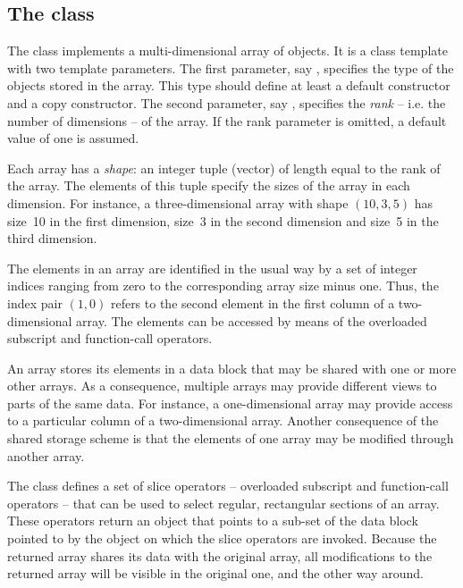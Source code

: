 \subsection*{The  class}

The  class implements a multi-dimensional array of objects.
It is a class template with two template parameters. The first parameter,
say , specifies the type of the objects stored in the array. This
type should define at least a default constructor and a copy
constructor. The second parameter, say , specifies the
\emph{rank} -- i.e. the number of dimensions -- of the array. If the rank
parameter is omitted, a default value of one is assumed.

Each array has a \emph{shape}: an integer tuple (vector) of length equal
to the rank of the array. The elements of this tuple specify the sizes of
the array in each dimension. For instance, a three-dimensional array with
shape $(10,3,5)$ has size~10 in the first dimension, size~3 in the second
dimension and size~5 in the third dimension.

The elements in an array are identified in the usual way by a set of
integer indices ranging from zero to the corresponding array size minus
one. Thus, the index pair $(1,0)$ refers to the second element in the
first column of a two-dimensional array. The elements can be accessed by
means of the overloaded subscript and function-call operators.

An array stores its elements in a data block that may be shared with one
or more other arrays. As a consequence, multiple arrays may provide
different views to parts of the same data. For instance, a
one-dimensional array may provide access to a particular column of a
two-dimensional array. Another consequence of the shared storage scheme
is that the elements of one array may be modified through another
array.

The  class defines a set of slice operators -- overloaded
subscript and function-call operators -- that can be used to select
regular, rectangular sections of an array. These operators return an
 object that points to a sub-set of the data block pointed to
by the  object on which the slice operators are invoked.
Because the returned array shares its data with the original array, all
modifications to the returned array will be visible in the original
one, and the other way around.

